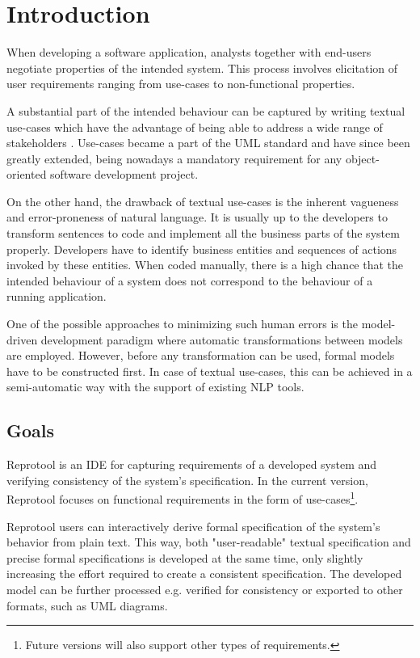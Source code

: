 \section{Introduction}

When developing a software application, analysts together with end-users negotiate properties of the intended system. This process involves elicitation of user requirements ranging from use-cases to non-functional properties.

A substantial part of the intended behaviour can be captured by writing textual use-cases which have the advantage of being able to address a wide range of stakeholders \cite{Larman,Cockburn:2000:WEU:517669}. Use-cases became a part of the \ac{UML} standard \cite{UML-standard} and have since been greatly extended, being nowadays a mandatory requirement for any object-oriented software development project.

On the other hand, the drawback of textual use-cases is the inherent vagueness and error-proneness of natural language. It is usually up to the developers to transform sentences to code and implement all the business parts of the system properly. Developers have to identify business entities and sequences of actions invoked by these entities. When coded manually, there is a high chance that the intended behaviour of a system does not correspond to the behaviour of a running application.

One of the possible approaches to minimizing such human errors is the model-driven development paradigm \cite{MDD} where automatic transformations between models are employed. However, before any transformation can be used, formal models have to be constructed first. In case of textual use-cases, this can be achieved in a semi-automatic way with the support of existing \ac{NLP} tools.

\subsection{Goals}
Reprotool is an \ac{IDE} for capturing requirements of a developed system and verifying consistency of the system's specification.
In the current version, Reprotool focuses on functional requirements in the form of use-cases\footnote{Future versions will also support other types of requirements.}.

Reprotool users can interactively derive formal specification of the system's behavior from plain text. This way, both "user-readable" textual specification and precise formal specifications is developed at the same time, only slightly increasing the effort required to create a consistent specification. The developed model can be further processed e.g. verified for consistency or exported to other formats, such as \ac{UML} diagrams.

